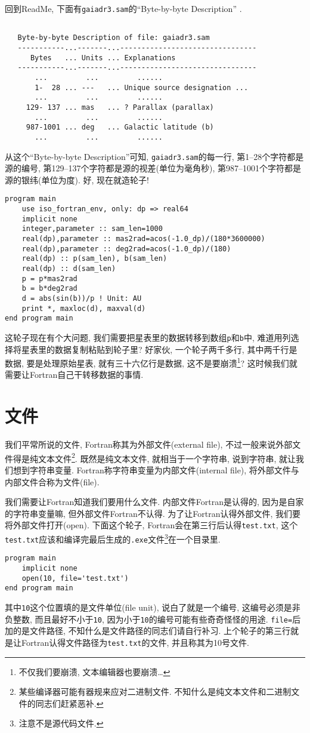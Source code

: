 回到ReadMe, 下面有\texttt{gaiadr3.sam}的``Byte-by-byte Description'' .
\begin{lstlisting}

   Byte-by-byte Description of file: gaiadr3.sam
   -----------...-------...--------------------------------
      Bytes   ... Units ... Explanations
   -----------...-------...--------------------------------
       ...         ...         ......
       1-  28 ... ---   ... Unique source designation ...
       ...         ...         ......
     129- 137 ... mas   ... ? Parallax (parallax)
       ...         ...         ......
     987-1001 ... deg   ... Galactic latitude (b)
       ...         ...         ......
\end{lstlisting}
从这个``Byte-by-byte Description''可知, \texttt{gaiadr3.sam}的每一行, 第1--28个字符都是源的编号, 第129--137个字符都是源的视差(单位为毫角秒), 第987--1001个字符都是源的银纬(单位为度). 好, 现在就造轮子!\label{gaiadr3.sam}
\begin{lstlisting}
program main
    use iso_fortran_env, only: dp => real64
    implicit none
    integer,parameter :: sam_len=1000
    real(dp),parameter :: mas2rad=acos(-1.0_dp)/(180*3600000)
    real(dp),parameter :: deg2rad=acos(-1.0_dp)/(180)
    real(dp) :: p(sam_len), b(sam_len)
    real(dp) :: d(sam_len)
    p = p*mas2rad
    b = b*deg2rad
    d = abs(sin(b))/p ! Unit: AU
    print *, maxloc(d), maxval(d)
end program main
\end{lstlisting}
这轮子现在有个大问题, 我们需要把星表里的数据转移到数组\texttt{p}和\texttt{b}中, 难道用列选择将星表里的数据复制粘贴到轮子里? 好家伙, 一个轮子两千多行, 其中两千行是数据, 要是处理原始星表, 就有三十六亿行是数据, 这不是要崩溃\footnote{不仅我们要崩溃, 文本编辑器也要崩溃\dots}? 这时候我们就需要让Fortran自己干转移数据的事情.

\section{文件}

我们平常所说的文件, Fortran称其为外部文件(external file), 不过一般来说外部文件得是纯文本文件\footnote{某些编译器可能有器规来应对二进制文件. 不知什么是纯文本文件和二进制文件的同志们赶紧恶补.}. 既然是纯文本文件, 就相当于一个字符串, 说到字符串, 就让我们想到字符串变量. Fortran称字符串变量为内部文件(internal file), 将外部文件与内部文件合称为文件(file).

我们需要让Fortran知道我们要用什么文件. 内部文件Fortran是认得的, 因为是自家的字符串变量嘛, 但外部文件Fortran不认得. 为了让Fortran认得外部文件, 我们要将外部文件打开(open). 下面这个轮子, Fortran会在第三行后认得\texttt{test.txt}, 这个\texttt{test.txt}应该和编译完最后生成的\texttt{.exe}文件\footnote{注意不是源代码文件.}在一个目录里.
\begin{lstlisting}
program main
    implicit none
    open(10, file='test.txt')
end program main
\end{lstlisting}
其中\texttt{10}这个位置填的是文件单位(file unit), 说白了就是一个编号, 这编号必须是非负整数, 而且最好不小于\texttt{10}, 因为小于\texttt{10}的编号可能有些奇奇怪怪的用途. \texttt{file=}后加的是文件路径, 不知什么是文件路径的同志们请自行补习. 上个轮子的第三行就是让Fortran认得文件路径为\texttt{test.txt}的文件, 并且称其为10号文件.

